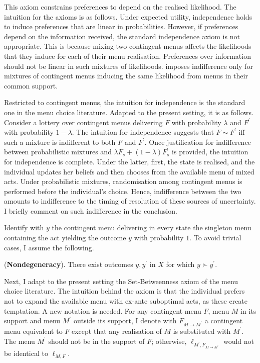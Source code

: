 This axiom constrains preferences to depend on the realised likelihood. The intuition for the axioms is as follows. Under expected utility, independence holds to induce preferences that are linear in probabilities. However, if preferences depend on the information received, the standard independence axiom is not appropriate. This is because mixing two contingent menus affects the likelihoods that they induce for each of their menu realisation. Preferences over information should not be linear in such mixtures of likelihoods.  imposes indifference only for mixtures of contingent menus inducing the same likelihood from menus in their common support.

Restricted to  contingent menus, the intuition for independence is the standard one in the menu choice literature. Adapted to the present setting, it is as follows. Consider a lottery over contingent menus delivering \( F \) with probability \( \lambda \) and \( F^{\prime} \) with probability \( 1 - \lambda \). The intuition for independence suggests that \( F \sim F^{\prime} \) iff such a mixture is indifferent to both \( F \) and \( F^{\prime} \). Once justification for indifference between probabilistic mixtures and \( \lambda F_{s} + \left( 1- \lambda \right) F^{\prime}_{s} \) is provided, the intuition for independence is complete. Under the latter, first, the state is realised, and the individual updates her beliefs and then chooses from the available menu of mixed acts. Under probabilistic mixtures, randomisation among contingent menus is performed before the individual's choice. Hence, indifference between the two amounts to indifference to the timing of resolution of these sources of uncertainty. I briefly comment on such indifference in the conclusion.

Identify with \( y \) the contingent menu delivering in every state the singleton menu containing the act yielding the outcome \( y \) with probability \( 1 \). To avoid trivial cases, I assume the following.

\begin{axiom}\label{ax:degeneracy}

	(\textbf{Nondegeneracy}). There exist outcomes \(y, y^{\prime}\) in \(X\) for which \(y \succ y^{\prime}\).

\end{axiom}

Next, I adapt to the present setting the Set-Betweenness axiom of the menu choice literature. The intuition behind the axiom is that the individual prefers not to expand the available menu with ex-ante suboptimal acts, as these create temptation. A new notation is needed. For any contingent menu \( F \), menu \( M \) in its support and menu \( M^{\prime} \) outside its support, I denote with \( F_{M \rightarrow M^{\prime}} \) a contingent menu equivalent to \( F \) except that any realisation of \( M \) is substituted with \( M^{\prime} \). The menu \( M^{\prime} \) should not be in the support of \( F \); otherwise, \( \ell_{M^{\prime}, F_{M \rightarrow M^{\prime}}} \) would not be identical to \( \ell_{M,F} \).


